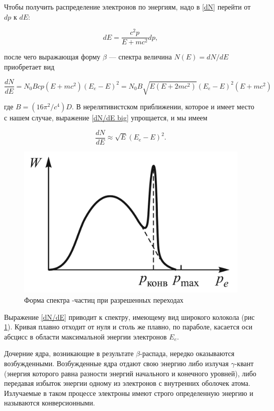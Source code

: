 \documentclass[a4paper,12pt]{report}
\begin{document}
Чтобы получить распределение электронов по энергиям, надо в \eqref{dN} перейти от $ dp $ к $ dE $:

\begin{equation}
dE = \dfrac{c^2p}{E + mc^2}dp,
\end{equation}

после чего выражающая форму $\beta$ --- спектра величина $ N(E) = dN/dE $
приобретает вид

\begin{equation}\label{dN/dE big}
\dfrac{dN}{dE} = N_0Bcp(E + mc^2)(E_e - E)^2 = N_0B\sqrt{E(E + 2mc^2)}(E_e - E)^2(E + mc^2)
\end{equation}

где $B = (16\pi^2/c^4)D$. В нерелятивистском приближении, которое и имеет место с нашем случае, выражение \eqref{dN/dE big} упрощается, и мы имеем

\begin{equation}\label{dN/dE}
\dfrac{dN}{dE} \approx \sqrt{E}(E_e - E)^2.
\end{equation}

\begin{figure}
	\includegraphics[width=\linewidth]{spektr}
	\caption{Форма спектра \be-частиц
		при разрешенных переходах}
	\label{ris spetr}
\end{figure}


Выражение \eqref{dN/dE} приводит к спектру, имеющему вид широкого колокола (рис \ref{ris spetr}). Кривая плавно отходит от нуля и столь же плавно, по параболе, касается оси абсцисс в области максимальной энергии электронов $E_e$. 

Дочерние ядра, возникающие в результате $\beta$-распада, нередко оказываются возбужденными. Возбужденные ядра отдают свою энергию либо излучая $\gamma$-квант (энергия которого равна разности энергий начального и конечного уровней), либо передавая избыток энергии одному из электронов с внутренних оболочек атома. Излучаемые в таком процессе электроны имеют строго определенную энергию и называются конверсионными.
\end{document}
